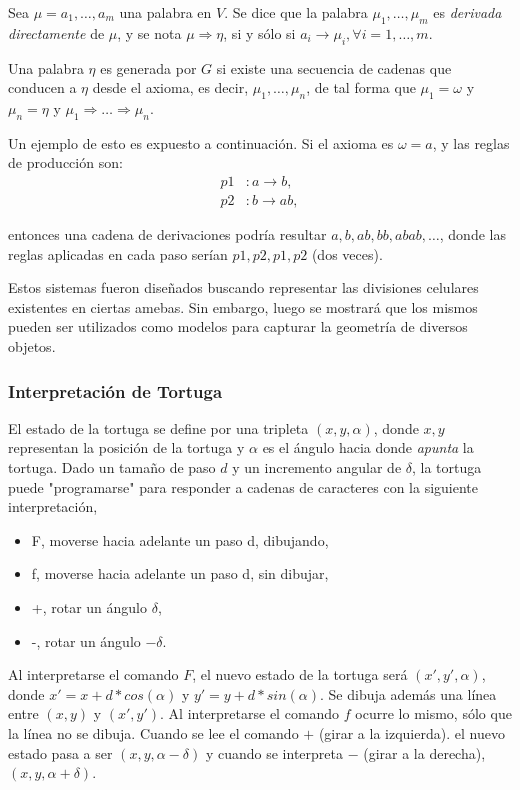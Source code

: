 Sea $\mu = a_{1}, \dots, a_{m}$ una palabra en $V$.
Se dice que la palabra $\mu_{1}, \dots, \mu_{m}$ es {\em derivada directamente} de $\mu$, y se nota $\mu \Rightarrow \eta$,  si y sólo si $a_{i} \rightarrow \mu_{i}, \forall i = 1, \dots, m$.

Una palabra $\eta$ es generada por $G$ si existe una secuencia de cadenas que conducen a $\eta$ desde el axioma, es decir, $\mu_{1},\dots,\mu_{n}$, de tal forma que $\mu_{1} = \omega$ y $\mu_{n} = \eta$ y $\mu_{1} \Rightarrow \dots  \Rightarrow \mu_{n}$.

Un ejemplo de esto es expuesto a continuación.
Si el axioma es $\omega = a$, y las reglas de producción son:
\begin{align*}
p1 &: a \rightarrow b,\\
p2 &: b \rightarrow ab,
\end{align*}

entonces una cadena de derivaciones podría resultar $a, b, ab, bb, abab, \dots$, donde las reglas aplicadas en cada paso serían $p1, p2, p1, p2$ (dos veces).

Estos sistemas fueron diseñados buscando representar las divisiones celulares existentes en ciertas amebas.
Sin embargo, luego se mostrará que los mismos pueden ser utilizados como modelos para capturar la geometría de diversos objetos.

\subsubsection{Interpretación de Tortuga}
El estado de la tortuga se define por una tripleta $(x,y,\alpha)$, donde $x,y$ representan la posición de la tortuga y $\alpha$ es el ángulo hacia donde {\em apunta} la tortuga.
Dado un tamaño de paso $d$ y un incremento angular de $\delta$, la tortuga puede "programarse" para responder a cadenas de caracteres con la siguiente interpretación,

\begin{itemize}
\item F, moverse hacia adelante un paso d, dibujando,
\item f, moverse hacia adelante un paso d, sin dibujar,
\item +, rotar un ángulo $\delta$,
\item -, rotar un ángulo $-\delta$.
\end{itemize}

Al interpretarse el comando $F$, el nuevo estado de la tortuga será $(x',y',\alpha)$, donde $x' = x + d * cos(\alpha)$ y $y' = y + d * sin(\alpha)$. Se dibuja además una línea entre $(x,y)$ y $(x',y')$.
Al interpretarse el comando $f$ ocurre lo mismo, sólo que la línea no se dibuja.
Cuando se lee el comando $+$ (girar a la izquierda). el nuevo estado pasa a ser $(x,y,\alpha-\delta)$ y cuando se interpreta $-$ (girar a la derecha),  $(x,y,\alpha+\delta)$.

